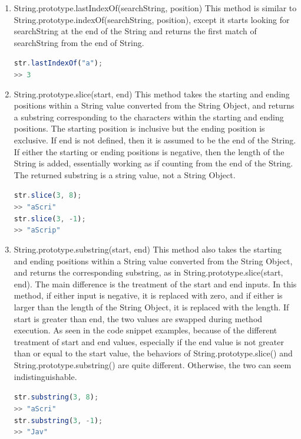 \documentclass[a4paper,11pt,twoside]{report}
\def\jsinline{\lstinline[language=JavaScript, basicstyle=\small]}
\begin{document}
\begin{enumerate}
\item String.prototype.lastIndexOf(searchString, position) \newline
This method is similar to String.prototype.indexOf(searchString, position), except it starts looking for searchString at the end of the String and returns the first match of searchString from the end of String.

\jsinline|str.lastIndexOf("a");| \\
\jsinline|>> 3|

\item String.prototype.slice(start, end) \newline
This method takes the starting and ending positions within a String value converted from the String Object, and returns a substring corresponding to the characters within the starting and ending positions. The starting position is inclusive but the ending position is exclusive. If end is not defined, then it is assumed to be the end of the String. If either the starting or ending positions is negative, then the length of the String is added, essentially working as if counting from the end of the String. The returned substring is a string value, not a String Object.

\jsinline|str.slice(3, 8);| \\
\jsinline|>> "aScri"| \\
\jsinline|str.slice(3, -1);| \\
\jsinline|>> "aScrip"|

\item String.prototype.substring(start, end) \newline
This method also takes the starting and ending positions within a String value converted from the String Object, and returns the corresponding substring, as in String.prototype.slice(start, end). The main difference is the treatment of the start and end inputs. In this method, if either input is negative, it is replaced with zero, and if either is larger than the length of the String Object, it is replaced with the length. If start is greater than end, the two values are swapped during method execution. As seen in the code snippet examples, because of the different treatment of start and end values, especially if the end value is not greater than or equal to the start value, the behaviors of String.prototype.slice() and String.prototype.substring() are quite different. Otherwise, the two can seem indistinguishable.

\jsinline|str.substring(3, 8);| \\
\jsinline|>> "aScri"| \\
\jsinline|str.substring(3, -1);| \\
\jsinline|>> "Jav"|

\end{enumerate}
\end{document}
